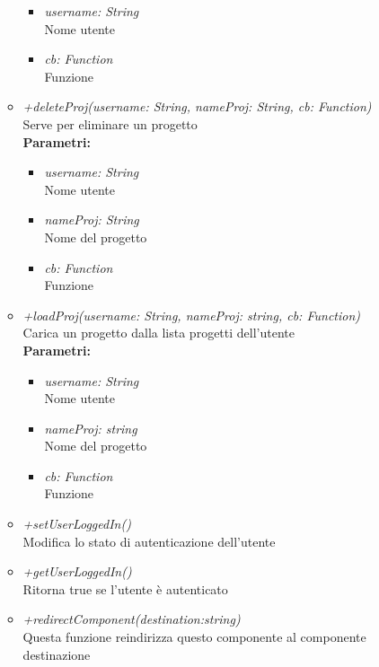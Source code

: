 \begin{itemize}
\begin{itemize}
    		\begin{itemize}
    			\item \emph{username: String}\\
    			Nome utente
    			\item \emph{cb: Function}\\
    			Funzione
    		\end{itemize}
    		\item \emph{+deleteProj(username: String, nameProj: String, cb: Function)}\\
    		Serve per eliminare un progetto\\
    		\textbf{Parametri:}
    		\begin{itemize}
    			\item \emph{username: String}\\
    			Nome utente
    			\item \emph{nameProj: String}\\
    			Nome del progetto
    			\item \emph{cb: Function}\\
    			Funzione
    		\end{itemize}
    		\item \emph{+loadProj(username: String, nameProj: string, cb: Function)}\\
    		Carica un progetto dalla lista progetti dell'utente\\
    		\textbf{Parametri:}
    		\begin{itemize}
    			\item \emph{username: String}\\
    			Nome utente
    			\item \emph{nameProj: string}\\
    			Nome del progetto
    			\item \emph{cb: Function}\\
    			Funzione
    		\end{itemize}
    		\item \emph{+setUserLoggedIn()}\\
    		Modifica lo stato di autenticazione dell'utente
    		\item \emph{+getUserLoggedIn()}\\
    		Ritorna true se l'utente è autenticato
    		\item \emph{+redirectComponent(destination:string)}\\
    		Questa funzione reindirizza questo componente al componente destinazione\\

\end{itemize}
\end{itemize}
